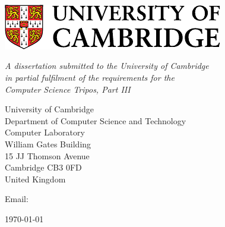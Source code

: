 \begin{titlepage} 

\begin{center}
\noindent
\huge
\dissertationtitle \\
\end{center}

\begin{center}
\noindent
\huge
\authorname \\
\Large
\authorcollege      \\[24pt]
\includegraphics{figures/CUni3.pdf}
\end{center}

\vspace{24pt} 

\begin{center}
\noindent
\large
{\it A dissertation submitted to the University of Cambridge \\ 
in partial fulfilment of the requirements for the\\ 
Computer Science Tripos, Part III} 
\end{center}

\begin{center}
\noindent
University of Cambridge \\
Department of Computer Science and Technology \\
Computer Laboratory     \\
William Gates Building  \\
15 JJ Thomson Avenue    \\
Cambridge CB3 0FD       \\
{\sc United Kingdom}    \\
\end{center}

\begin{center}
\noindent
Email: \authoremail \\
\end{center}

\begin{center}
\noindent
\today
\end{center}

\end{titlepage} 

\newpage
\vspace*{\fill}
